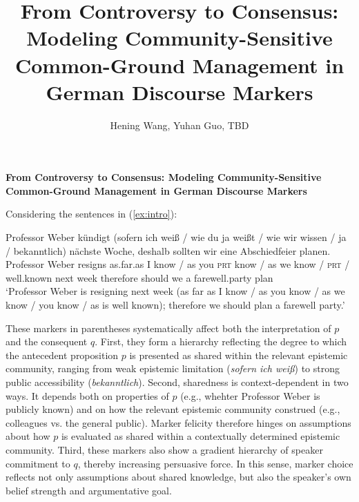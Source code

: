 \documentclass[12pt]{article}
\title{From Controversy to Consensus: Modeling Community-Sensitive Common-Ground Management in German Discourse Markers}
\author{Hening Wang, Yuhan Guo, TBD}
\date{}
\begin{document}

\textbf{\large From Controversy to Consensus: Modeling Community-Sensitive Common-Ground Management in German Discourse Markers}

Considering the sentences in (\ref{ex:intro}):

\begin{exe}
\ex \label{ex:intro}
Professor Weber kündigt (sofern ich weiß / wie du ja weißt / wie wir wissen / ja / bekanntlich) nächste Woche, deshalb sollten wir eine Abschiedfeier planen.\\
Professor Weber resigns as.far.as I know / as you \textsc{prt} know / as we know / \textsc{prt} / well.known next week therefore should we a farewell.party plan\\
`Professor Weber is resigning next week (as far as I know / as you know / as we know / you know / as is well known); therefore we should plan a farewell party.'
\end{exe}

These markers in parentheses systematically affect both the interpretation of $p$ and the consequent $q$. First, they form a hierarchy reflecting the degree to which the antecedent proposition $p$ is presented as shared within the relevant epistemic community, ranging from weak epistemic limitation (\textit{sofern ich weiß}) to strong public accessibility (\textit{bekanntlich}). Second, sharedness is context-dependent in two ways. It depends both on properties of $p$ (e.g., whehter Professor Weber is publicly known) and on how the relevant epistemic community construed (e.g., colleagues vs. the general public). Marker felicity therefore hinges on assumptions about how $p$ is evaluated as shared within a contextually determined epistemic community. Third, these markers also show a gradient hierarchy of speaker commitment to $q$, thereby increasing persuasive force. In this sense, marker choice reflects not only assumptions about shared knowledge, but also the speaker's own belief strength and argumentative goal.
\end{document}
